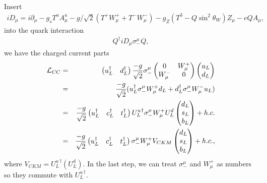 \documentclass[11pt]{article}
\def\del{{\partial}}
\begin{document}
\section{ }
Insert
\begin{eqnarray}
    iD_\mu =i\del_\mu - g_s T^a A^a_\mu
                          - g/\sqrt2 ( T^+ W^+_\mu + T^- W^-_\mu )
                          - g_Z (T^3 -Q\sin^2\theta_W) Z_\mu
                          - e Q A_\mu,
\end{eqnarray}
into the quark interaction
\begin{eqnarray}
    Q^\dagger iD_\mu \sigma_-^\mu Q,
\end{eqnarray}
we have the charged current parts
\begin{eqnarray}
    {\cal L} _{CC}
    &=& 
    \begin{pmatrix}
      u_L^\dagger & d_L^\dagger
    \end{pmatrix} 
    \frac{-g}{\sqrt2} \sigma_-^\mu
    \begin{pmatrix}
      0 & W^+_\mu\\
      W^-_\mu & 0
    \end{pmatrix}
    \begin{pmatrix}
      u_L \\ d_L
    \end{pmatrix}\\ 
    &=& \frac{-g}{\sqrt2} ( u_L^\dagger \sigma_-^\mu W^+_\mu d_L
    + d_L^\dagger \sigma_-^\mu W^-_\mu u_L ) \\
    &=& \frac{-g}{\sqrt2}
    \begin{pmatrix}
        u_L^\dagger & c_L^\dagger & t_L^\dagger
    \end{pmatrix}
    {U^u_L}^\dagger \sigma_-^\mu W^+_\mu U^d_L 
    \begin{pmatrix}
        d_L \\ s_L \\ b_L 
    \end{pmatrix}
    + h.c. \\
    &=& \frac{-g}{\sqrt2} 
    \begin{pmatrix}
        u_L^\dagger & c_L^\dagger & t_L^\dagger
    \end{pmatrix}
    \sigma_-^\mu W^+_\mu V_{CKM} 
    \begin{pmatrix}
    d_L \\ s_L \\ b_L 
    \end{pmatrix}
    + h.c.,
  \end{eqnarray}
where $V_{CKM} = {U^u_L}^\dagger (U^d_L)$. In the last step, we can treat $\sigma_-^\mu$ and $W_\mu^+$ as numbers so they commute with ${U^u_L}^\dagger $.
\end{document}
